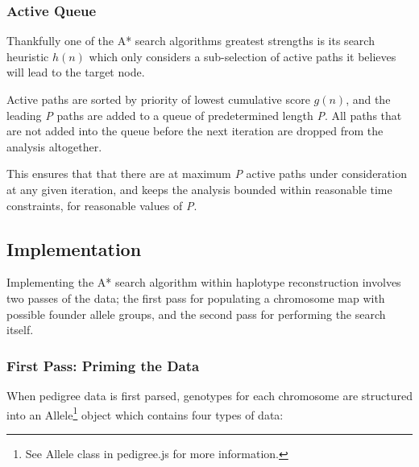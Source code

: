 \subsubsection{Active Queue}

Thankfully one of the A* search algorithms greatest strengths is its search heuristic $h(n)$ which only considers a sub-selection of active paths it believes will lead to the target node. 

Active paths are sorted by priority of lowest cumulative score $g(n)$, and the leading \textit{P} paths are added to a queue of predetermined length \textit{P}. All paths that are not added into the queue before the next iteration are dropped from the analysis altogether. 

This ensures that that there are at maximum \textit{P} active paths under consideration at any given iteration, and keeps the analysis bounded within reasonable time constraints, for reasonable values of \textit{P}.


\subsection{Implementation}

Implementing the A* search algorithm within haplotype reconstruction involves two passes of the data; the first pass for populating a chromosome map with possible founder allele groups, and the second pass for performing the search itself.

\subsubsection{First Pass: Priming the Data}

When pedigree data is first parsed, genotypes for each chromosome are structured into an Allele\footnote{See Allele class in pedigree.js for more information.} object which contains four types of data:

\begin{description}
\end{description}

